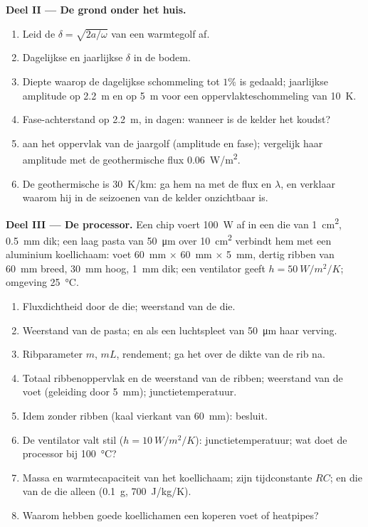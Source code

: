 \begin{problem}
\textbf{Deel II --- De grond onder het huis.}
\begin{enumerate}[resume]
  \item Leid de  $\delta = \sqrt{2a/\omega}$ van een
        warmtegolf af.
  \item Dagelijkse en jaarlijkse $\delta$ in de bodem.
  \item Diepte waarop de dagelijkse schommeling tot $1\%$ is gedaald; jaarlijkse
        amplitude op \qty{2.2}{m} en op \qty{5}{m} voor een oppervlakteschommeling
        van \qty{10}{K}.
  \item Fase-achterstand op \qty{2.2}{m}, in dagen: wanneer is de kelder het koudst?
  \item {} aan het oppervlak van de jaargolf (amplitude en fase);
        vergelijk haar amplitude met de geothermische flux \qty{0.06}{W/m^2}.
  \item De geothermische  is \qty{30}{K/km}: ga hem na met de
        flux en $\lambda$, en verklaar waarom hij in de seizoenen van de
        kelder onzichtbaar is.
\end{enumerate}

\textbf{Deel III --- De processor.}
Een chip voert \qty{100}{W} af in een die van \qty{1}{cm^2}, \qty{0.5}{mm}
dik; een laag pasta van \qty{50}{\micro m} over \qty{10}{cm^2} verbindt hem
met een aluminium koellichaam: voet \qty{60}{mm} $\times$ \qty{60}{mm} $\times$
\qty{5}{mm}, dertig ribben van \qty{60}{mm} breed, \qty{30}{mm} hoog, \qty{1}{mm}
dik; een ventilator geeft $h = \qty{50}{W/m^2/K}$; omgeving \qty{25}{\celsius}.
\begin{enumerate}[resume]
  \item Fluxdichtheid door de die; weerstand van de die.
  \item Weerstand van de pasta; en als een luchtspleet van \qty{50}{\micro m}
        haar verving.
  \item Ribparameter $m$, $mL$, rendement; ga het  over de
        dikte van de rib na.
  \item Totaal ribbenoppervlak en de weerstand van de ribben; weerstand van
        de voet (geleiding door \qty{5}{mm}); junctietemperatuur.
  \item Idem zonder ribben (kaal vierkant van \qty{60}{mm}): besluit.
  \item De ventilator valt stil ($h = \qty{10}{W/m^2/K}$): junctietemperatuur;
        wat doet de processor bij \qty{100}{\celsius}?
  \item Massa en warmtecapaciteit van het koellichaam; zijn tijdconstante $RC$;
        en die van de die alleen (\qty{0.1}{g}, \qty{700}{J/kg/K}).
  \item Waarom hebben goede koellichamen een koperen voet of heatpipes?
\end{enumerate}


\end{problem}
